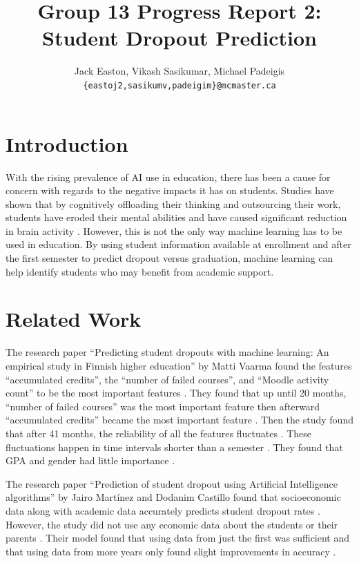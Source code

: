 \documentclass[11pt]{article}
\title{Group 13 Progress Report 2:\\Student Dropout Prediction}
\author{Jack Easton, Vikash Sasikumar, Michael Padeigis \\
  \texttt{\{eastoj2,sasikumv,padeigim\}@mcmaster.ca} }
\begin{document}
\maketitle

\section{Introduction}

With the rising prevalence of AI use in education, there has been a cause for concern with regards to the negative impacts it has on students. Studies have shown that by cognitively offloading their thinking and outsourcing their work, students have eroded their mental abilities and have caused significant reduction in brain activity \citep{hogenboom2026}. However, this is not the only way machine learning has to be used in education. By using student information available at enrollment and after the first semester to predict dropout versus graduation, machine learning can help identify students who may benefit from academic support.

\section{Related Work}

The research paper “Predicting student dropouts with machine learning: An empirical study in Finnish higher education” by Matti Vaarma found the features “accumulated credits”, the “number of failed courses”, and “Moodle activity count” to be the most important features \citep{vaarma2024}. They found that up until 20 months, “number of failed courses” was the most important feature then afterward “accumulated credits” became the most important feature \citep{vaarma2024}. Then the study found that after 41 months, the reliability of all the features fluctuates \citep{vaarma2024}. These fluctuations happen in time intervals shorter than a semester \citep{vaarma2024}. They found that GPA and gender had little importance \citep{vaarma2024}. 

The research paper “Prediction of student dropout using Artificial Intelligence algorithms” by Jairo Martínez and Dodanim Castillo found that socioeconomic data along with academic data accurately predicts student dropout rates \citep{martínez2024}. However, the study did not use any economic data about the students or their parents \citep{martínez2024}. Their model found that using data from just the first was sufficient and that using data from more years only found slight improvements in accuracy \citep{martínez2024}. 
\end{document}
